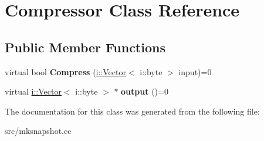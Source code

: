 \hypertarget{class_compressor}{}\section{Compressor Class Reference}
\label{class_compressor}
\subsection*{Public Member Functions}
\begin{DoxyCompactItemize}
\item 
\hypertarget{class_compressor_af15254cf677c6669214362b456cf34ac}{}virtual bool {\bfseries Compress} (\hyperlink{classv8_1_1internal_1_1_vector}{i\+::\+Vector}$<$ i\+::byte $>$ input)=0\label{class_compressor_af15254cf677c6669214362b456cf34ac}

\item 
\hypertarget{class_compressor_aedc467a3ea66a9424918c01d00b93dae}{}virtual \hyperlink{classv8_1_1internal_1_1_vector}{i\+::\+Vector}$<$ i\+::byte $>$ $\ast$ {\bfseries output} ()=0\label{class_compressor_aedc467a3ea66a9424918c01d00b93dae}

\end{DoxyCompactItemize}


The documentation for this class was generated from the following file\+:\begin{DoxyCompactItemize}
\item 
src/mksnapshot.\+cc\end{DoxyCompactItemize}
